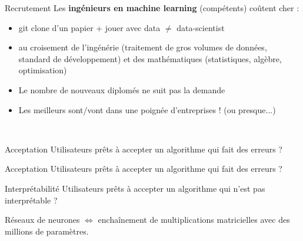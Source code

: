 \begin{frame}{Recrutement}
  Les \textbf{ingénieurs en machine learning} (compétents) coûtent cher :
  \begin{itemize}
    \item git clone d'un papier + jouer avec data $\neq$ data-scientist
    \item au croisement de l'ingénérie (traitement de gros volumes de données, standard de développement) et des mathématiques (statistiques, algèbre, optimisation)
    \item Le nombre de nouveaux diplomés ne suit pas la demande
    \item Les meilleurs sont/vont dans une poignée d'entreprises ! (ou presque...)
  \end{itemize}
  \begin{minipage}[l]{0.55\linewidth}
    ~
  \end{minipage}\hfill
  \begin{minipage}[l]{0.44\linewidth}
  \end{minipage}\hfill
\end{frame}

\begin{frame}{Acceptation}
  Utilisateurs prêts à accepter un algorithme qui fait des erreurs ?
\end{frame}

\begin{frame}{Acceptation}
  Utilisateurs prêts à accepter un algorithme qui fait des erreurs ?
\end{frame}

\begin{frame}{Interprétabilité}
  Utilisateurs prêts à accepter un algorithme qui n'est pas interprétable ?

  Réseaux de neurones $\iff$ enchaînement de multiplications matricielles avec des millions de paramètres.

\end{frame}
